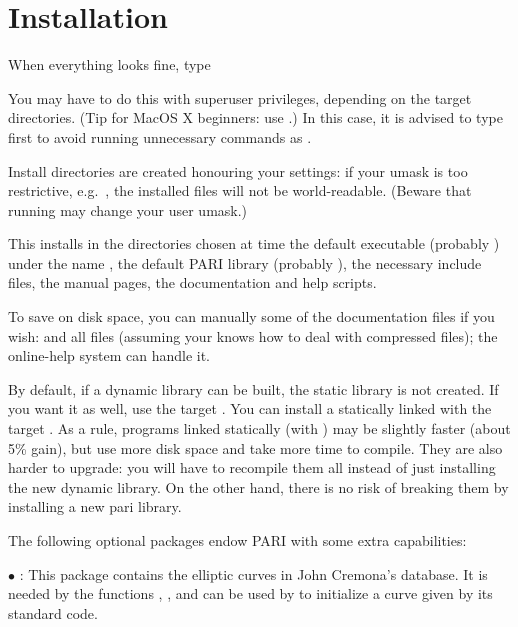 \section{Installation} When everything looks fine, type


\noindent You may have to do this with superuser privileges, depending on the
target directories. (Tip for MacOS X beginners: use .)
In this case, it is advised to type  first to avoid running
unnecessary commands as .

 Install directories are created honouring your 
settings: if your umask is too restrictive, e.g.~, the installed
files will not be world-readable. (Beware that running  may change
your user umask.)

This installs in the directories chosen at  time the default
 executable (probably ) under the name , the
default PARI library (probably ), the necessary include
files, the manual pages, the documentation and help scripts.

To save on disk space, you can manually  some of the documentation
files if you wish:  and all  files (assuming your
 knows how to deal with compressed files); the online-help system
can handle it.

By default, if a dynamic library  can be built, the static
library  is not created. If you want it as well, use the target
. You can install a statically
linked  with the target . As a rule,
programs linked statically (with ) may be slightly faster
(about 5\% gain), but use more disk space and take more time to compile.
They are also harder to upgrade: you will have to recompile them all instead
of just installing the new dynamic library. On the other hand, there is no
risk of breaking them by installing a new pari library.

 The following optional packages endow PARI with some
extra capabilities:

$\bullet$ : This package contains the elliptic curves in
John Cremona's database. It is needed by the functions ,
,  and can be used by  to initialize a curve given by its standard code.

